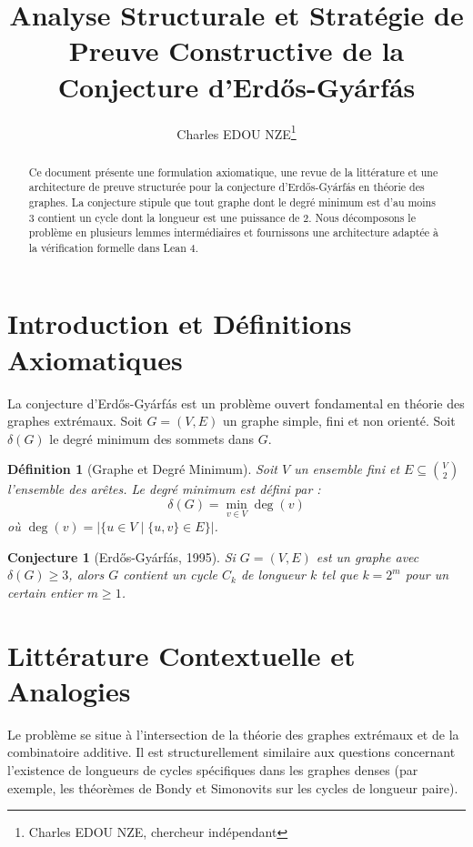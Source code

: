 \documentclass[11pt,a4paper]{article}
\title{Analyse Structurale et Stratégie de Preuve Constructive de la Conjecture d'Erd\H{o}s-Gy\'{a}rf\'{a}s}
\author{Charles EDOU NZE\thanks{Charles EDOU NZE, chercheur indépendant}}
\date{}
\newtheorem{definition}[theorem]{Définition}
\newtheorem{conjecture}[theorem]{Conjecture}
\begin{document}
\maketitle

\begin{abstract}
Ce document présente une formulation axiomatique, une revue de la littérature et une architecture de preuve structurée pour la conjecture d'Erd\H{o}s-Gy\'{a}rf\'{a}s en théorie des graphes. La conjecture stipule que tout graphe dont le degré minimum est d'au moins 3 contient un cycle dont la longueur est une puissance de 2. Nous décomposons le problème en plusieurs lemmes intermédiaires et fournissons une architecture adaptée à la vérification formelle dans Lean 4.
\end{abstract}

\section{Introduction et Définitions Axiomatiques}
La conjecture d'Erd\H{o}s-Gy\'{a}rf\'{a}s est un problème ouvert fondamental en théorie des graphes extrémaux. Soit $G = (V, E)$ un graphe simple, fini et non orienté. Soit $\delta(G)$ le degré minimum des sommets dans $G$.

\begin{definition}[Graphe et Degré Minimum]
Soit $V$ un ensemble fini et $E \subseteq \binom{V}{2}$ l'ensemble des arêtes. Le degré minimum est défini par :
\[
\delta(G) = \min_{v \in V} \deg(v)
\]
où $\deg(v) = |\{u \in V \mid \{u, v\} \in E\}|$.
\end{definition}

\begin{conjecture}[Erd\H{o}s-Gy\'{a}rf\'{a}s, 1995]
Si $G = (V, E)$ est un graphe avec $\delta(G) \ge 3$, alors $G$ contient un cycle $C_k$ de longueur $k$ tel que $k = 2^m$ pour un certain entier $m \ge 1$.
\end{conjecture}

\section{Littérature Contextuelle et Analogies}
Le problème se situe à l'intersection de la théorie des graphes extrémaux et de la combinatoire additive. Il est structurellement similaire aux questions concernant l'existence de longueurs de cycles spécifiques dans les graphes denses (par exemple, les théorèmes de Bondy et Simonovits sur les cycles de longueur paire).
\end{document}
